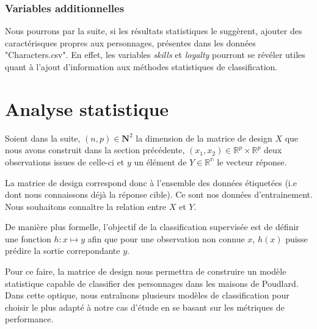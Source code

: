 \documentclass[11pt]{article}
\begin{document}
\begin{center}
\subsubsection{Variables additionnelles}

Nous pourrons par la suite, si les résultats statistiques le suggèrent, ajouter des caractérisques propres aux personnages, présentes dans les données "Characters.csv". En effet, les variables \textit{skills} et \textit{loyalty} pourront se révéler utiles quant à l'ajout d'information aux méthodes statistiques de classification.\par

\newpage

\section{Analyse statistique}

Soient dans la suite, $(n,p) \in \mathbf{N}^{2}$ la dimension de la matrice de design $X$ que nous avons construit dans la section précédente, $(x_{1}, x_{2}) \in \mathbb{R}^{p} \times \mathbb{R}^{p}$ deux observations issues de celle-ci et $y$ un élément de $Y \in \mathbb{R^n}$ le vecteur réponse.\par

La matrice de design correspond donc à l'ensemble des données étiquetées (i.e dont nous connaissons déjà la réponse cible). Ce sont nos données d'entrainement. Nous souhaitons connaître la relation entre $X$ et $Y$.\par

De manière plus formelle, l'objectif de la classification supervisée est de définir une fonction $h : x \mapsto y$ afin que pour une observation non connue $x$, $h(x)$ puisse prédire la sortie correpondante $y$.\par

Pour ce faire, la matrice de design nous permettra de construire un modèle statistique capable de classifier des personnages dans les maisons de Poudlard. Dans cette optique, nous entraînons plusieurs modèles de classification pour choisir le plus adapté à notre cas d'étude en se basant sur les métriques de performance.\par


\end{center}
\end{document}
